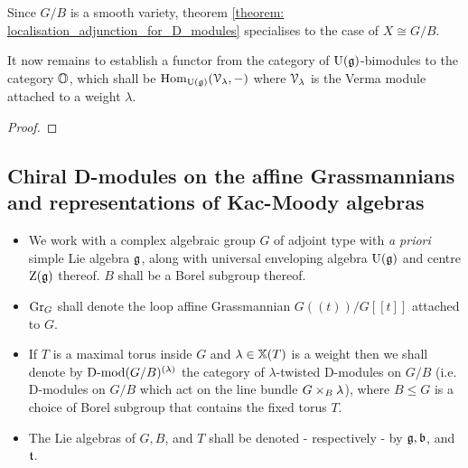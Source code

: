                 \begin{corollary}
                    Since $G/B$ is a smooth variety, theorem \ref{theorem: localisation_adjunction_for_D_modules} specialises to the case of $X \cong G/B$.
                \end{corollary}
                
                It now remains to establish a functor from the category of $\mathrm{U}(\mathfrak{g})$-bimodules to the category $\mathbb{O}$, which shall be $\mathrm{Hom}_{\mathrm{U}(\mathfrak{g})}(\mathcal{V}_{\lambda}, -)$ where $\mathcal{V}_{\lambda}$ is the Verma module attached to a weight $\lambda$. 
                \begin{theorem} \label{theorem: beilinson_bernstein_localisation}
                    
                \end{theorem}
                    \begin{proof}
                        
                    \end{proof}
                \begin{corollary} \label{coro: borel_weil_bott_theorem}
                    
                \end{corollary}
        
        \subsection{Chiral D-modules on the affine Grassmannians and representations of Kac-Moody algebras} \label{subsection: localisation_of_affine_lie_algebras}
            \begin{convention} \label{conv: chiral_beilinson_bernstein_localisation_conventions}
                \noindent
                \begin{itemize}
                    \item We work with a complex algebraic group $G$ of adjoint type with \textit{a priori} simple Lie algebra $\mathfrak{g}$, along with universal enveloping algebra $\mathrm{U}(\mathfrak{g})$ and centre $\mathrm{Z}(\mathfrak{g})$ thereof. $B$ shall be a Borel subgroup thereof. 
                    \item $\mathrm{Gr}_G$ shall denote the loop affine Grassmannian $G(\!(t)\!)/G[\![t]\!]$ attached to $G$.
                    \item If $T$ is a maximal torus inside $G$ and $\lambda \in \mathbb{X}(T)$ is a weight then we shall denote by $\mathrm{D}\text{-}\mathrm{mod}(G/B)^{(\lambda)}$ the category of $\lambda$-twisted D-modules on $G/B$ (i.e. D-modules on $G/B$ which act on the line bundle $G \x_B \lambda$), where $B \leq G$ is a choice of Borel subgroup that contains the fixed torus $T$.
                    \item The Lie algebras of $G, B$, and $T$ shall be denoted - respectively - by $\mathfrak{g}, \mathfrak{b}$, and $\mathfrak{t}$.
                \end{itemize}
            \end{convention}
            
